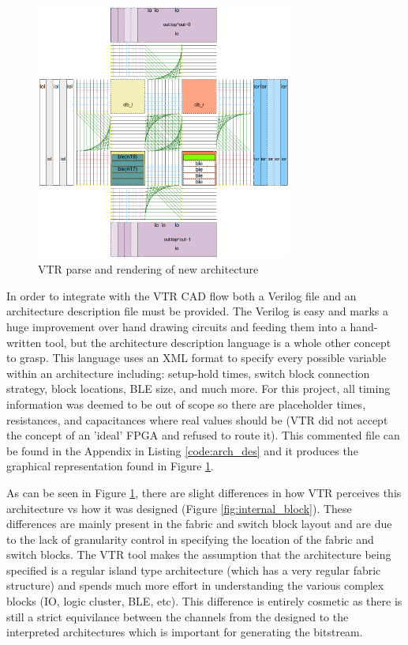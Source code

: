 \documentclass[12pt]{article}
\begin{document}
\begin{figure}[H]
    \centering
    \includegraphics[width=0.75\textwidth]{vtr_arch}
    \caption{VTR parse and rendering of new architecture}
    \label{fig:vtr_arch}
\end{figure}

In order to integrate with the VTR CAD flow both a Verilog file and an architecture
description file must be
provided. The Verilog is easy and marks a huge improvement over hand drawing circuits
and feeding them into a hand-written tool, but the architecture description language
is a whole other concept to grasp. This language uses an XML format to specify every
possible variable within an architecture including: setup-hold times, switch block
connection strategy, block locations, BLE size, and much more. For this project, all
timing information was deemed to be out of scope so there are placeholder times, resistances,
and capacitances where real values should be (VTR did not accept the concept of
an 'ideal' FPGA and refused to route it). This commented file can be found in the Appendix
in Listing \ref{code:arch_des}
and it produces the graphical representation found in Figure \ref{fig:vtr_arch}.

As can be seen in Figure \ref{fig:vtr_arch}, there are slight differences in how VTR
perceives this architecture vs how it was designed (Figure \ref{fig:internal_block}).
These differences are mainly present in the fabric and switch block layout and are
due to the lack of granularity control in specifying the location of the fabric and switch blocks.
The VTR tool makes the assumption that the architecture being specified is a regular
island type architecture (which has a very regular fabric structure) and spends much
more effort in understanding the various complex blocks (IO, logic cluster, BLE, etc).
This difference is entirely cosmetic as there is still a strict equivilance between
the channels from the designed to the interpreted architectures which is important for
generating the bitstream.
\end{document}

